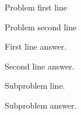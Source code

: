 \begin{problem}
  Problem first line

  Problem second line
\end{problem}

First line answer.


Second line answer.


\begin{subproblem}
  Subproblem line.
\end{subproblem}

Subproblem answer.
